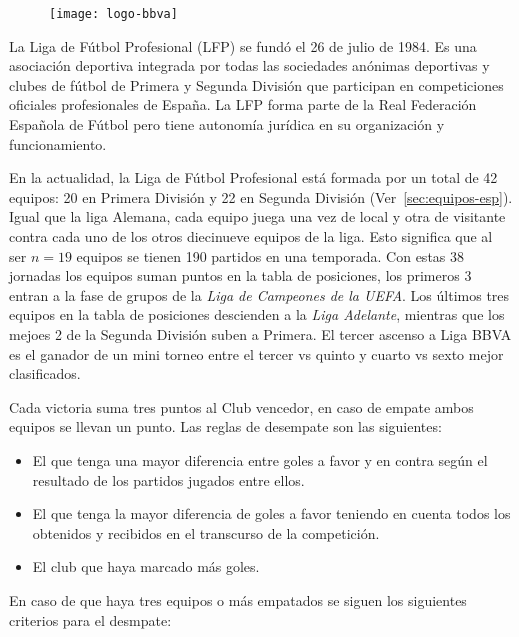 \begin{figure}[!htb]\centering
   \begin {minipage}{0.5\textwidth}
     \texttt{[image: logo-bbva]}
   \end{minipage}
\end{figure}

La Liga de Fútbol Profesional (LFP) se fundó el 26 de julio de 1984. Es una asociación deportiva integrada por todas las sociedades anónimas deportivas y clubes de fútbol de Primera y Segunda División que participan en competiciones oficiales profesionales de España. La LFP forma parte de la Real Federación Española de Fútbol pero tiene autonomía jurídica en su organización y funcionamiento. 

En la actualidad, la Liga de Fútbol Profesional está formada por un total de 42 equipos: 20 en Primera División y 22 en Segunda División (Ver~\ref{sec:equipos-esp}). Igual que la liga Alemana, cada equipo juega una vez de local y otra de visitante contra cada uno de los otros diecinueve equipos de la liga. Esto significa que al ser $n=19$ equipos se tienen 190 partidos en una temporada. Con estas 38 jornadas los equipos suman puntos en la tabla de posiciones, los primeros 3 entran a la fase de grupos de la \emph{Liga de Campeones de la UEFA}. Los últimos tres equipos en la tabla de posiciones descienden a la \emph{Liga Adelante}, mientras que los mejoes 2 de la Segunda División suben a Primera. El tercer ascenso a Liga BBVA es el ganador de un mini torneo entre el tercer vs quinto y cuarto vs sexto mejor clasificados.

Cada victoria suma tres puntos al Club vencedor, en caso de empate ambos equipos se llevan un punto. Las reglas de desempate son las siguientes: 
\begin{itemize}

	\item El que tenga una mayor diferencia entre goles a favor y en contra según el resultado de los partidos jugados entre ellos.

	\item El que tenga la mayor diferencia de goles a favor teniendo en cuenta todos los obtenidos y recibidos en el transcurso de la competición.

	\item El club que haya marcado más goles.

\end{itemize}

En caso de que haya tres equipos o más empatados se siguen los siguientes criterios para el desmpate:

